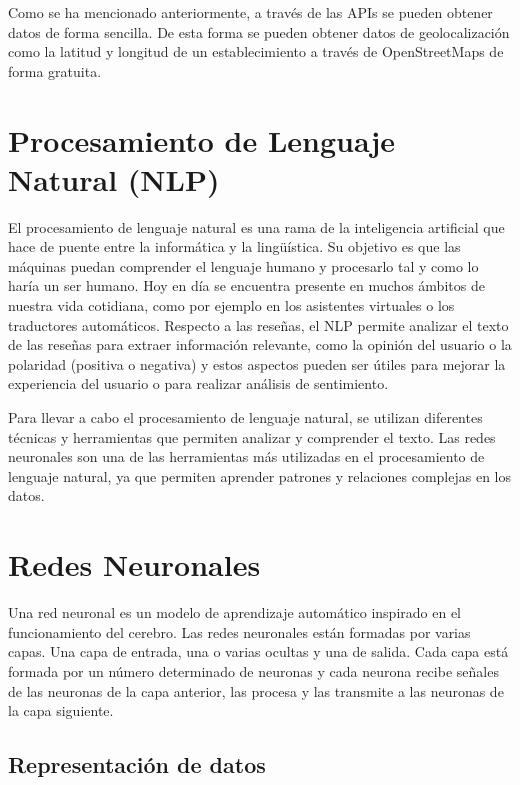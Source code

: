 Como se ha mencionado anteriormente, a través de las APIs se pueden obtener datos de forma sencilla.
De esta forma se pueden obtener datos de geolocalización como la latitud y longitud de un establecimiento a través de OpenStreetMaps de forma gratuita.

\section{Procesamiento de Lenguaje Natural (NLP)}

El procesamiento de lenguaje natural es una rama de la inteligencia artificial que hace de puente entre la informática y la lingüística. 
Su objetivo es que las máquinas puedan comprender el lenguaje humano y procesarlo tal y como lo haría un ser humano. \cite{udit:nlp}
Hoy en día se encuentra presente en muchos ámbitos de nuestra vida cotidiana, como por ejemplo en los asistentes virtuales o los traductores automáticos.
Respecto a las reseñas, el NLP permite analizar el texto de las reseñas para extraer información relevante, como la opinión del usuario o la polaridad (positiva o negativa) y estos aspectos pueden ser útiles para mejorar la experiencia del usuario o para realizar análisis de sentimiento.

Para llevar a cabo el procesamiento de lenguaje natural, se utilizan diferentes técnicas y herramientas que permiten analizar y comprender el texto.
Las redes neuronales son una de las herramientas más utilizadas en el procesamiento de lenguaje natural, ya que permiten aprender patrones y relaciones complejas en los datos.

\section{Redes Neuronales}

Una red neuronal es un modelo de aprendizaje automático inspirado en el funcionamiento del cerebro.
Las redes neuronales están formadas por varias capas. Una capa de entrada, una o varias ocultas y una de salida.
Cada capa está formada por un número determinado de neuronas y cada neurona recibe señales de las neuronas de la capa anterior, las procesa y las transmite a las neuronas de la capa siguiente.


\subsection{Representación de datos}

